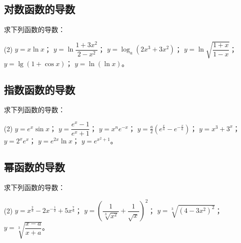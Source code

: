 \subsection{对数函数的导数}
\begin{Practice}
  求下列函数的导数：
  \begin{tasks}(2)
    \task $y=x\ln x$；
    \task $y=\ln\dfrac{1+3x^2}{2-x^2}$；
    \task $y=\log_a(2x^3+3x^2)$；
    \task $y=\ln\sqrt{\dfrac{1+x}{1-x}}$；
    \task $y=\lg(1+\cos x)$；
    \task $y=\ln(\ln x)$。
  \end{tasks}
\end{Practice}

\subsection{指数函数的导数}
\begin{Practice}
  求下列函数的导数：
  \begin{tasks}(2)
    \task $y=e^x\sin x$；
    \task $y=\dfrac{e^x-1}{e^x+1}$；
    \task $y=x^ne^{-x}$；
    \task $y=\frac{a}{2}(e^{\frac{x}{a}}-e^{-\frac{x}{a}})$；
    \task $y=x^3+3^x$；
    \task $y=2^xe^x$；
    \task $y=e^{2x}\ln x$；
    \task $y=e^{x^2+1}$。
  \end{tasks}
\end{Practice}

\subsection{幂函数的导数}
\begin{Practice}
  求下列函数的导数：
  \begin{tasks}(2)
    \task $y=x^{\frac{2}{3}}-2x^{-\frac{1}{2}}+5x^{\frac{7}{6}}$；
    \task $y=\left(\dfrac{1}{\sqrt[3]{x^2}}+\dfrac{1}{\sqrt{x}}\right)^2$；
    \task $y=\sqrt[3]{(4-3x^2)^2}$；
    \task $y=\sqrt[3]{\dfrac{x-a}{x+a}}$。
  \end{tasks}
\end{Practice}

\begin{Exercise}
  \begin{question}
    \item 
    \item 
    \item 
    \item 
    \item 
    \item 
    \item 
    \item 
    \item 
  \end{question}
\end{Exercise}

